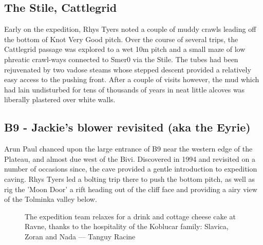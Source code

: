 \subsection{The Stile, Cattlegrid}
Early on the expedition, Rhys Tyers noted a couple of muddy crawls leading off the bottom of Knot Very Good pitch. Over the course of several trips, the Cattlegrid passage was explored to a wet 10m pitch and a small maze of low phreatic crawl-ways connected to Smer0 via the Stile. The tubes had been rejuvenated by two vadose steams whose stepped descent provided a relatively easy access to the pushing front. After a couple of visits however, the mud which had lain undisturbed for tens of thousands of years in neat little alcoves was liberally plastered over white walls.

\subsection{B9 - Jackie's blower revisited (aka the Eyrie)}
Arun Paul chanced upon the large entrance of B9 near the western edge of the Plateau, and almost due west of the Bivi. Discovered in 1994 and revisited on a number of occasions since, the cave provided a gentle introduction to expedition caving. Rhys Tyers led a bolting trip there to push the bottom pitch, as well as rig the 'Moon Door' a rift heading out of the cliff face and providing a airy view of the Tolminka valley below.

 

\begin{figure*}[b!]
\checkoddpage \ifoddpage \forcerectofloat \else \forceversofloat \fi
\centering
{}
\caption{The expedition team relaxes for a drink and cottage cheese cake at Ravne, thanks to the hospitality of the Koblucar family: Slavica, Zoran and Nada --- Tanguy Racine}
\label{Elecdreams}
\end{figure*}



\begin{figure*}[t!]
\centering
{}
\caption{}
\label{}
\end{figure*}

\begin{figure*}[t!]
\centering
{}
\caption{}
\label{}
\end{figure*}